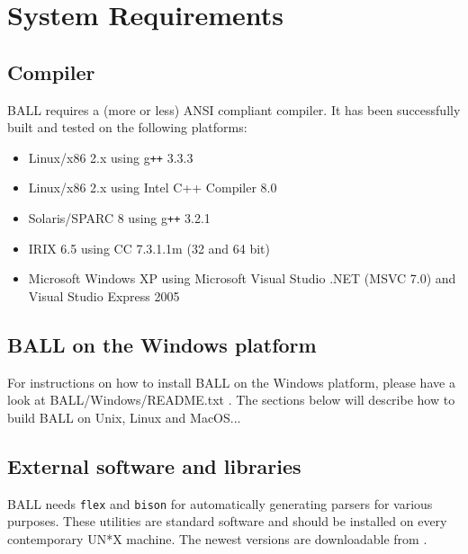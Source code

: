 \section{System Requirements}

\subsection{Compiler}
  BALL requires a (more or less) ANSI compliant \CPP compiler.
  It has been successfully built and tested on the following platforms:
	\begin{itemize}	
   	\item Linux/x86 2.x using g{\tt ++} 3.3.3
   	\item Linux/x86 2.x using Intel C++ Compiler 8.0
   	\item Solaris/SPARC 8 using g{\tt ++} 3.2.1
   	\item IRIX 6.5 using CC 7.3.1.1m (32 and 64 bit)
		\item Microsoft Windows XP using Microsoft Visual Studio .NET (MSVC 7.0) and Visual Studio Express 2005
 	\end{itemize}

\subsection{BALL on the Windows platform}
For instructions on how to install BALL on the Windows platform, please
have a look at BALL/Windows/README.txt . The sections below will describe
how to build BALL on Unix, Linux and MacOS...

\subsection{External software and libraries}
BALL needs {\tt flex} and {\tt bison} for automatically generating parsers
for various purposes. These utilities are standard software and should be
installed on every contemporary UN*X machine. The newest versions are
downloadable from .

